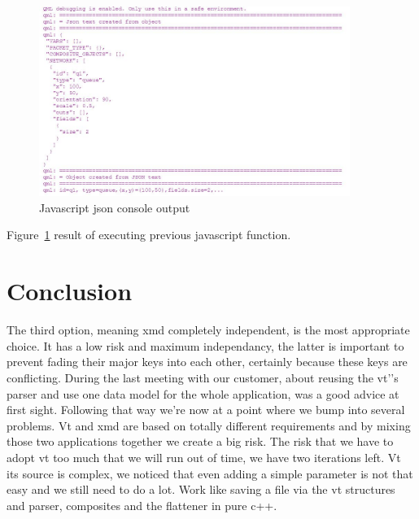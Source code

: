\documentclass[a4paper,11pt,final]{article}
\begin{document}
\paragraph{}
\begin{figure}[here]
\includegraphics[width=0.90\textwidth]{js_json_result}
\caption{Javascript json console output}
\label{fig:js_json_result}
\end{figure}
Figure~\ref{fig:js_json_result} result of executing previous javascript function.

\section{Conclusion}
The third option, meaning xmd completely independent, is the most
appropriate choice. It has a low risk and maximum independancy,
the latter is important to prevent fading their major keys into
each other, certainly because these keys are conflicting.
During the last meeting with our customer, about reusing
the vt'’s parser and use one data model for the whole application,
was a good advice at first sight. Following that way we're
now at a point where we bump into several problems.
Vt and xmd are based on totally different requirements and by mixing
those two applications together we create a big risk. The risk
that we have to adopt vt too much that we will run out of time, we
have two iterations left.
Vt its source is complex, we noticed that even adding a simple parameter 
is not that easy and we still need to do a lot. Work like saving a file via
the vt structures and parser, composites and the flattener in pure c++.

\paragraph{}
\end{document}
